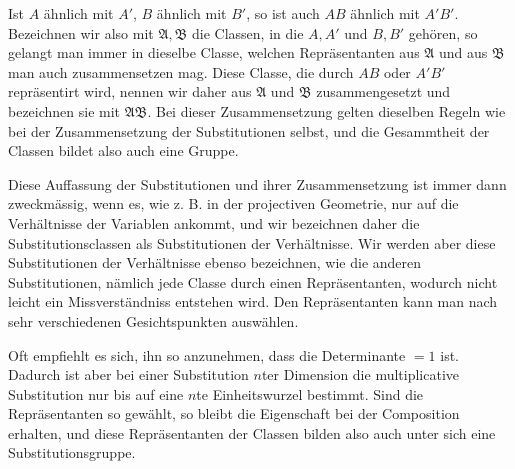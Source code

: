 \documentclass[11pt]{article}
\begin{document}
Ist $A$ ähnlich mit $A'$, $B$ ähnlich mit $B'$, so ist auch $AB$ ähnlich mit $A'B'$. Bezeichnen wir also mit $\mathfrak A,\mathfrak B$ die Classen, in die $A,A'$ und $B,B'$ gehören, so gelangt man immer in dieselbe Classe, welchen Repräsentanten aus $\mathfrak A$ und aus $\mathfrak B$ man auch zusammensetzen mag. Diese Classe, die durch $AB$ oder $A'B'$ repräsentirt wird, nennen wir daher aus $\mathfrak A$ und $\mathfrak B$ zusammengesetzt und bezeichnen sie mit $\mathfrak A\mathfrak B$. Bei dieser Zusammensetzung gelten dieselben Regeln wie bei der Zusammensetzung der Substitutionen selbst, und die Gesammtheit der Classen bildet also auch eine Gruppe.

Diese Auffassung der Substitutionen und ihrer Zusammensetzung ist immer dann zweckmässig, wenn es, wie z. B. in der projectiven Geometrie, nur auf die Verhältnisse der Variablen ankommt, und wir bezeichnen daher die Substitutionsclassen als Substitutionen der Verhältnisse. Wir werden aber diese Substitutionen der Verhältnisse ebenso bezeichnen, wie die anderen Substitutionen, nämlich jede Classe durch einen Repräsentanten, wodurch nicht leicht ein Missverständniss entstehen wird. Den Repräsentanten kann man nach sehr verschiedenen Gesichtspunkten auswählen.

Oft empfiehlt es sich, ihn so anzunehmen, dass die Determinante $=1$ ist. Dadurch ist aber bei einer Substitution $n$ter Dimension die multiplicative Substitution nur bis auf eine $n$te Einheitswurzel bestimmt. Sind die Repräsentanten so gewählt, so bleibt die Eigenschaft bei der Composition erhalten, und diese Repräsentanten der Classen bilden also auch unter sich eine Substitutionsgruppe.
\end{document}
